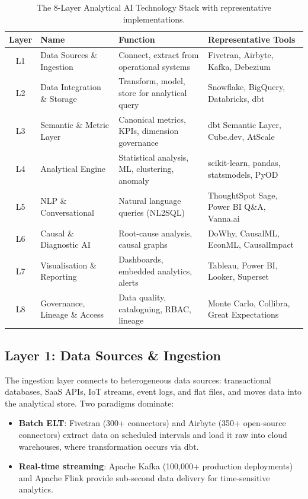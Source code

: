 \documentclass[12pt, a4paper]{article}
\begin{document}
\begin{table}[ht]
\centering
\caption{The 8-Layer Analytical AI Technology Stack with representative implementations.}
\label{tab:stack}
\begin{tabular}{c >{\raggedright\arraybackslash}p{3.5cm} >{\raggedright\arraybackslash}p{4.8cm} >{\raggedright\arraybackslash}p{4.3cm}}
\toprule
\textbf{Layer} & \textbf{Name} & \textbf{Function} & \textbf{Representative Tools} \\
\midrule
L1 & Data Sources \& Ingestion     & Connect, extract from operational systems   & Fivetran, Airbyte, Kafka, Debezium \\
L2 & Data Integration \& Storage   & Transform, model, store for analytical query & Snowflake, BigQuery, Databricks, dbt \\
L3 & Semantic \& Metric Layer      & Canonical metrics, KPIs, dimension governance & dbt Semantic Layer, Cube.dev, AtScale \\
L4 & Analytical Engine             & Statistical analysis, ML, clustering, anomaly & scikit-learn, pandas, statsmodels, PyOD \\
L5 & NLP \& Conversational         & Natural language queries (NL2SQL)            & ThoughtSpot Sage, Power BI Q\&A, Vanna.ai \\
L6 & Causal \& Diagnostic AI       & Root-cause analysis, causal graphs            & DoWhy, CausalML, EconML, CausalImpact \\
L7 & Visualisation \& Reporting    & Dashboards, embedded analytics, alerts        & Tableau, Power BI, Looker, Superset \\
L8 & Governance, Lineage \& Access & Data quality, cataloguing, RBAC, lineage      & Monte Carlo, Collibra, Great Expectations \\
\bottomrule
\end{tabular}
\end{table}

\subsection{Layer 1: Data Sources \& Ingestion}
The ingestion layer connects to heterogeneous data sources: transactional databases, SaaS APIs, IoT streams, event logs, and flat files, and moves data into the analytical store. Two paradigms dominate:

\begin{itemize}
    \item \textbf{Batch ELT}: Fivetran (300+ connectors) and Airbyte (350+ open-source connectors) extract data on scheduled intervals and load it raw into cloud warehouses, where transformation occurs via dbt.
    \item \textbf{Real-time streaming}: Apache Kafka (100,000+ production deployments) and Apache Flink provide sub-second data delivery for time-sensitive analytics.
\end{itemize}
\end{document}
